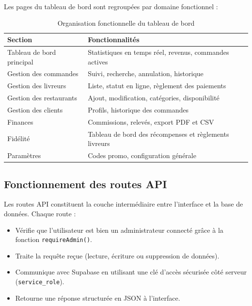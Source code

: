 \documentclass[12pt,fleqn,a4paper]{report}
\begin{document}
\begin{justify}
Les pages du tableau de bord sont regroupées par domaine
fonctionnel :

\begin{table}[H]
\centering
\renewcommand{\arraystretch}{1.4}
\begin{tabular}{|l|l|}
\hline
\textbf{Section} & \textbf{Fonctionnalités} \\
\hline
Tableau de bord principal &
Statistiques en temps réel, revenus, commandes actives \\
\hline
Gestion des commandes &
Suivi, recherche, annulation, historique \\
\hline
Gestion des livreurs &
Liste, statut en ligne, règlement des paiements \\
\hline
Gestion des restaurants &
Ajout, modification, catégories, disponibilité \\
\hline
Gestion des clients &
Profils, historique des commandes \\
\hline
Finances &
Commissions, relevés, export PDF et CSV \\
\hline
Fidélité &
Tableau de bord des récompenses et règlements livreurs \\
\hline
Paramètres &
Codes promo, configuration générale \\
\hline
\end{tabular}
\caption{Organisation fonctionnelle du tableau de bord}
\end{table}

\subsection{Fonctionnement des routes API}

Les routes API constituent la couche intermédiaire entre
l'interface et la base de données. Chaque route :

\begin{itemize}
    \item Vérifie que l'utilisateur est bien un administrateur
    connecté grâce à la fonction \texttt{requireAdmin()}.

    \item Traite la requête reçue (lecture, écriture ou
    suppression de données).

    \item Communique avec Supabase en utilisant une clé
    d'accès sécurisée côté serveur (\texttt{service\_role}).

    \item Retourne une réponse structurée en JSON à
    l'interface.
\end{itemize}


\end{justify}
\end{document}
